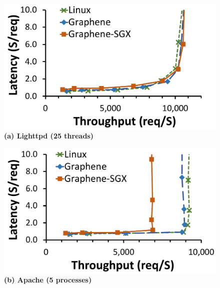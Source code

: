 \begin{figure}[t!]
\centering

\begin{minipage}{.45\textwidth}
\centering
\footnotesize
\vspace{6pt}
\includegraphics[width=\linewidth]{sgx/lighttpd-throughput-latency}\\
\vspace{3pt}
{\bf (a) Lighttpd (25 threads)}
\vspace{6pt}
\end{minipage}
\begin{minipage}{.45\textwidth}
\centering
\footnotesize
\vspace{6pt}
\includegraphics[width=\linewidth]{sgx/apache-throughput-latency}\\
\vspace{3pt}
{\bf (b) Apache (5 processes)}
\vspace{6pt}
\end{minipage}
\begin{minipage}{.45\textwidth}

\end{minipage}
\end{figure}
